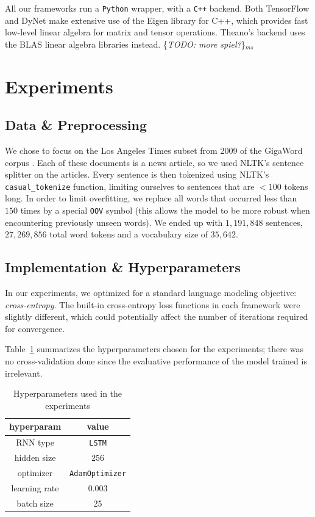 \documentclass{article}
\newcommand{\ms}[1]{{\color{cyan}\{\textit{#1}\}$_{ms}$}}
\begin{document}
All our frameworks run a \texttt{Python} wrapper, with a \texttt{C++} backend. Both TensorFlow and DyNet make extensive use of the Eigen library for C++, which provides fast low-level linear algebra for matrix and tensor operations. Theano's backend uses the BLAS linear algebra libraries instead.
\ms{TODO: more spiel?}

\section{Experiments}
\subsection{Data \& Preprocessing}
We chose to focus on the Los Angeles Times subset from 2009 of the GigaWord corpus \cite{gigaword}. Each of these documents is a news article, so we used NLTK’s \cite{nltk} sentence splitter on the articles. Every sentence is then tokenized using NLTK’s \verb!casual_tokenize! function, limiting ourselves to sentences that are $<100$ tokens long. In order to limit overfitting, we replace all words that occurred less than $150$ times by a special \verb!OOV! symbol (this allows the model to be more robust when encountering previously unseen words). We ended up with $1,191,848$ sentences, $27,269,856$ total word tokens and a vocabulary size of $35,642$.

\subsection{Implementation \& Hyperparameters}
In our experiments, we optimized for a standard language modeling objective: \textit{cross-entropy}. The built-in cross-entropy loss functions in each framework were slightly different, which could potentially affect the number of iterations required for convergence.

Table~\ref{tab:hyperparams} summarizes the hyperparameters chosen for the experiments; there was no cross-validation done since the evaluative performance of the model trained is irrelevant.
\begin{table}\begin{center}
\begin{tabular}{cc}
\textbf{hyperparam} & \textbf{value} \\\hline
RNN type & \texttt{LSTM} \\
hidden size & $256$ \\
optimizer & \texttt{AdamOptimizer} \\
learning rate & $0.003$ \\
batch size & 25 \\
\end{tabular}
\caption{\label{tab:hyperparams}Hyperparameters used in the experiments}
\end{center}\end{table}
\end{document}
